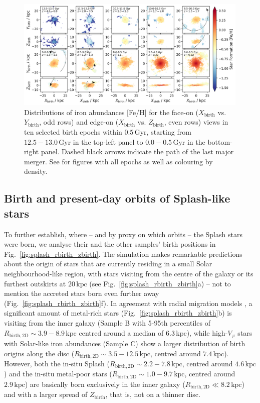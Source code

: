 \documentclass[fleqn,usenatbib]{mnras}
\begin{document}
\begin{figure}
    \centering
    \includegraphics[width=0.996\textwidth]{figures/trace_star_formation_xy_xz_feh_selection.png}
    \caption{Distributions of iron abundances {[Fe/H]} for the face-on ($X_\mathrm{birth}$ vs. $Y_\mathrm{birth}$, odd rows) and edge-on ($X_\mathrm{birth}$ vs. $Z_\mathrm{birth}$, even rows) views in ten selected birth epochs within $0.5\,\mathrm{Gyr}$, starting from $12.5-13.0\,\mathrm{Gyr}$ in the top-left panel to $0.0-0.5\,\mathrm{Gyr}$ in the bottom-right panel. Dashed black arrows indicate the path of the last major merger. See \href{https://github.com/svenbuder/golden_thread_II/tree/main/figures}{\faGithub} for figures with all epochs as well as colouring by density.}
    \label{fig:trace_star_formation_xy_xz_feh_selection}
\end{figure}

\subsection{Birth and present-day orbits of Splash-like stars}

To further establish, where -- and by proxy on which orbits -- the Splash stars were born, we analyse their and the other samples' birth positions in Fig.~\ref{fig:splash_rbirth_zbirth}. The simulation makes remarkable predictions about the origin of stars that are currently residing in a small Solar neighbourhood-like region, with stars visiting from the centre of the galaxy or its furthest outskirts at $20\,\mathrm{kpc}$ (see Fig.~\ref{fig:splash_rbirth_zbirth}a) -- not to mention the accreted stars born even further away (Fig.~\ref{fig:splash_rbirth_zbirth}f). In agreement with radial migration models \citep[for example][]{Frankel2018, Frankel2020}, a significant amount of metal-rich stars (Fig.~\ref{fig:splash_rbirth_zbirth}b) is visiting from the inner galaxy (Sample B with 5-95th percentiles of $R_\mathrm{birth, 2D} \sim 3.9 - 8.9\,\mathrm{kpc}$ centred around a median of $6.3\,\mathrm{kpc}$), while high-$V_\varphi$ stars with Solar-like iron abundances (Sample C) show a larger distribution of birth origins along the disc ($R_\mathrm{birth, 2D} \sim 3.5-12.5\,\mathrm{kpc}$, centred around $7.4\,\mathrm{kpc}$). However, both the in-situ Splash ($R_\mathrm{birth, 2D} \sim 2.2-7.8\,\mathrm{kpc}$, centred around $4.6\,\mathrm{kpc}$) and the in-situ metal-poor stars ($R_\mathrm{birth, 2D} \sim 1.0-9.7\,\mathrm{kpc}$, centred around $2.9\,\mathrm{kpc}$) are basically born exclusively in the inner galaxy ($R_\mathrm{birth, 2D} \ll 8.2\,\mathrm{kpc}$) and with a larger spread of $Z_\mathrm{birth}$, that is, not on a thinner disc.
\end{document}
